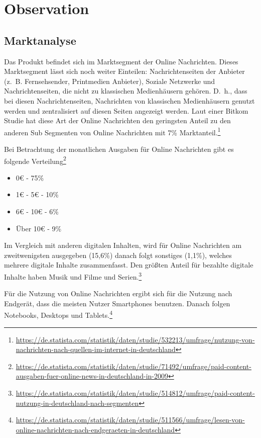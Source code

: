 
\section{Observation}

\subsection{Marktanalyse}

Das Produkt befindet sich im Marktsegment der Online Nachrichten. Dieses Marktsegment lässt sich noch weiter Einteilen: Nachrichtenseiten der Anbieter (z.~B. Fernsehsender, Printmedien Anbieter), Soziale Netzwerke und Nachrichtenseiten, die nicht zu klassischen Medienhäusern gehören. D.~h., dass bei diesen Nachrichtenseiten, Nachrichten von klassischen Medienhäusern genutzt werden und zentralisiert auf diesen Seiten angezeigt werden. Laut einer Bitkom Studie hat diese Art der Online Nachrichten den geringsten Anteil zu den anderen Sub Segmenten von Online Nachrichten mit 7\% Marktanteil.\footnote{\url{https://de.statista.com/statistik/daten/studie/532213/umfrage/nutzung-von-nachrichten-nach-quellen-im-internet-in-deutschland}}

Bei Betrachtung der monatlichen Ausgaben für Online Nachrichten gibt es folgende Verteilung\footnote{\url{https://de.statista.com/statistik/daten/studie/71492/umfrage/paid-content-ausgaben-fuer-online-news-in-deutschland-in-2009}}

\begin{itemize}
  \item 0€ - 75\%
  \item 1€ - 5€ - 10\%
  \item 6€ - 10€ - 6\%
  \item Über 10€ - 9\%
\end{itemize}

Im Vergleich mit anderen digitalen Inhalten, wird für Online Nachrichten am zweitwenigsten ausgegeben (15,6\%) danach folgt sonstiges (1,1\%), welches mehrere digitale Inhalte zusammenfasst. Den größten Anteil für bezahlte digitale Inhalte haben Musik und Filme und Serien.\footnote{\url{https://de.statista.com/statistik/daten/studie/514812/umfrage/paid-content-nutzung-in-deutschland-nach-segmenten}}

Für die Nutzung von Online Nachrichten ergibt sich für die Nutzung nach Endgerät, dass die meisten Nutzer Smartphones benutzen. Danach folgen Notebooks, Desktops und Tablets.\footnote{\url{https://de.statista.com/statistik/daten/studie/511566/umfrage/lesen-von-online-nachrichten-nach-endgeraeten-in-deutschland}}

